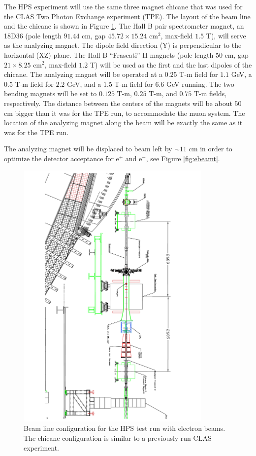 The HPS experiment will use the same three magnet chicane that was used for the CLAS Two Photon Exchange experiment (TPE). The layout of 
the beam line and the chicane is shown in Figure \ref{fig:ebeam}. The Hall B pair spectrometer magnet, an 18D36 (pole length $91.44$ cm, 
gap $45.72\times 15.24$ cm$^2$, max-field $1.5$ T), will serve as the analyzing magnet. The dipole field direction (Y) is perpendicular 
to the horizontal (XZ) plane. The Hall B ``Frascati'' H magnets (pole length $50$ cm, gap $21\times 8.25$ cm$^2$, max-field $1.2$ T) 
will be used as the first and the last dipoles of the chicane. The analyzing magnet will be operated at a $0.25$ T-m field for $1.1$ 
GeV, a $0.5$ T-m field for $2.2$ GeV, and a $1.5$ T-m field for $6.6$ GeV running. The two bending magnets will be set to  $0.125$ 
T-m, $0.25$ T-m, and $0.75$ T-m fields, respectively. The distance between the centers of the magnets will be about $50$ cm bigger than 
it was for the TPE run, to accommodate the muon system. The location of the analyzing magnet along the beam will be exactly the same  
as it was for the TPE run. 

The analyzing magnet will be displaced to beam left by $\sim 11$ cm in order to optimize the detector acceptance for e$^+$ 
and e$^-$, see Figure \ref{fig:ebeamt}.
 
 \begin{figure}[!ht]
\includegraphics[angle=180, width=0.85\textwidth]{beamline/HPS12_66840e051XX_ELEV.pdf}
\caption{\small{Beam line configuration for the HPS test run with electron beams. The chicane configuration is similar to a previously run 
CLAS experiment.}}\label{fig:ebeam}
\end{figure}

